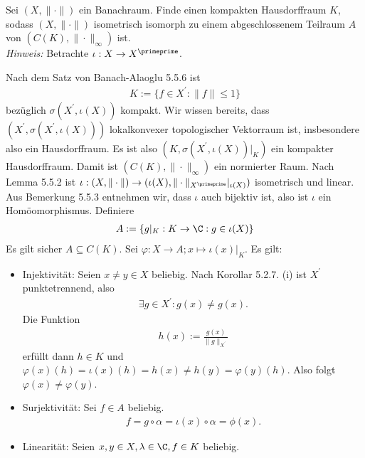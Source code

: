 \begin{exercise}
Sei $(X,\|\cdot\|)$ ein Banachraum. Finde einen kompakten Hausdorffraum $K$, sodass
$(X,\|\cdot\|)$ isometrisch isomorph zu einem abgeschlossenem Teilraum $A$ von
$(C(K),\|\cdot\|_{\infty})$ ist. \\
\textit{Hinweis:} Betrachte $\iota: X \to X^{\primeprime}$.
\end{exercise}
\begin{solution}
Nach dem Satz von Banach-Alaoglu 5.5.6 ist 
\begin{align*}
  K := \{f \in X^{\prime}: \|f\| \leq 1\}
\end{align*}
bezüglich $\sigma(X^{\prime}, \iota(X))$ kompakt.
Wir wissen bereits, dass $(X^{\prime}, \sigma(X^{\prime},\iota(X)))$ lokalkonvexer
topologischer Vektorraum ist, insbesondere also ein Hausdorffraum.
Es ist also $(K, \sigma(X^{\prime},\iota(X))|_K)$ ein kompakter Hausdorffraum.
Damit ist $(C(K), \|\cdot\|_{\infty})$ ein normierter Raum.
Nach Lemma 5.5.2 ist $\iota: (X,\|\cdot\|) \to (\iota(X),\|\cdot\|_{X^{\primeprime}}|_{\iota(X)})$
isometrisch und linear.
Aus Bemerkung 5.5.3 entnehmen wir, dass $\iota$ auch bijektiv ist, also ist $\iota$
ein Homöomorphismus.
Definiere
\begin{align*}
  A := \{g|_K: K \to \C: g \in \iota(X)\}
\end{align*}
Es gilt sicher $A \subseteq C(K)$.
Sei $\varphi: X \to A; x \mapsto \iota(x)|_K$.
Es gilt:
\begin{itemize}
  \item Injektivität: Seien $x \neq y \in X$ beliebig. Nach Korollar 5.2.7. (i)
  ist $X^{\prime}$ punktetrennend, also
  \begin{align*}
    \exists g \in X^{\prime}: g(x) \neq g(x).
  \end{align*}
  Die Funktion
  \begin{align*}
    h(x) := \frac{g(x)}{\|g\|_{X^{\prime}}}
  \end{align*}
  erfüllt dann $h \in K$ und $\varphi(x)(h) = \iota(x)(h) = h(x) \neq h(y) = \varphi(y)(h)$.
  Also folgt $\varphi(x) \neq \varphi(y)$.
  \item Surjektivität: Sei $f \in A$ beliebig. \\
  \begin{align*}
    f = g \circ \alpha = \iota(x) \circ \alpha = \phi(x).
  \end{align*}
  \item Linearität: Seien $x,y \in X, \lambda \in \C, f \in K$ beliebig.

\end{itemize}
\end{solution}
